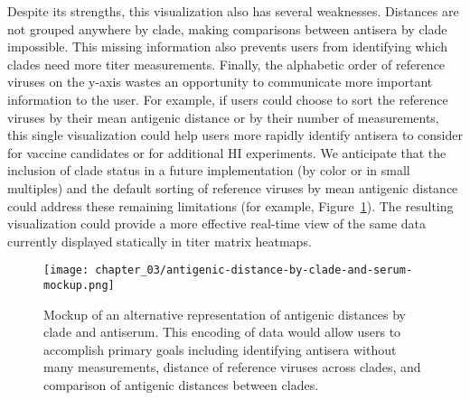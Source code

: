 Despite its strengths, this visualization also has several weaknesses.
Distances are not grouped anywhere by clade, making comparisons between antisera by clade impossible.
This missing information also prevents users from identifying which clades need more titer measurements.
Finally, the alphabetic order of reference viruses on the y-axis wastes an opportunity to communicate more important information to the user.
For example, if users could choose to sort the reference viruses by their mean antigenic distance or by their number of measurements, this single visualization could help users more rapidly identify antisera to consider for vaccine candidates or for additional HI experiments.
We anticipate that the inclusion of clade status in a future implementation (by color or in small multiples) and the default sorting of reference viruses by mean antigenic distance could address these remaining limitations (for example, Figure~\ref{fig:mockup-of-antigenic-distance-by-clade}).
The resulting visualization could provide a more effective real-time view of the same data currently displayed statically in titer matrix heatmaps.

\begin{figure}
  \centering
  \texttt{[image: chapter\_03/antigenic-distance-by-clade-and-serum-mockup.png]}
  \caption{\label{fig:mockup-of-antigenic-distance-by-clade} Mockup of an alternative representation of antigenic distances by clade and antiserum.
  This encoding of data would allow users to accomplish primary goals including identifying antisera without many measurements, distance of reference viruses across clades, and comparison of antigenic distances between clades.}
\end{figure}
